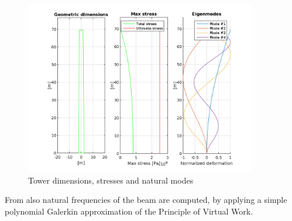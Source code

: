\begin{figure}[H]
\centering
\includegraphics[width=0.9\textwidth]{Images/Tower.png} 
\caption{Tower dimensions, stresses and natural modes}\label{fig:chord}
\end{figure}

From \cite{Bispl} also natural frequencies of the beam are computed, by applying a simple polynomial Galerkin approximation of the Principle of Virtual Work.  